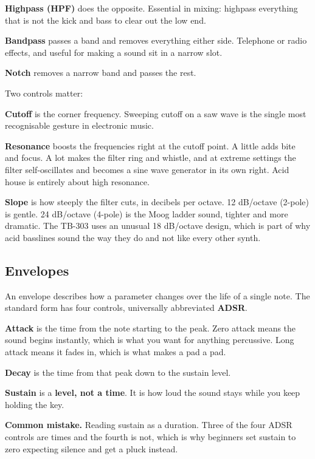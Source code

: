 \textbf{Highpass (HPF)} does the opposite. Essential in mixing: highpass everything that is not
the kick and bass to clear out the low end.

\textbf{Bandpass} passes a band and removes everything either side. Telephone or radio effects,
and useful for making a sound sit in a narrow slot.

\textbf{Notch} removes a narrow band and passes the rest.

Two controls matter:

\textbf{Cutoff} is the corner frequency. Sweeping cutoff on a saw wave is the single most
recognisable gesture in electronic music.

\textbf{Resonance} boosts the frequencies right at the cutoff point. A little adds bite and
focus. A lot makes the filter ring and whistle, and at extreme settings the filter
self-oscillates and becomes a sine wave generator in its own right. Acid house is entirely
about high resonance.

\textbf{Slope} is how steeply the filter cuts, in decibels per octave. 12 dB/octave (2-pole) is
gentle. 24 dB/octave (4-pole) is the Moog ladder sound, tighter and more dramatic. The
TB-303 uses an unusual 18 dB/octave design, which is part of why acid basslines sound the way
they do and not like every other synth.

\subsection{Envelopes}\label{th05_sound_design-envelopes}

An envelope describes how a parameter changes over the life of a single note. The standard
form has four controls, universally abbreviated \textbf{ADSR}.

\textbf{Attack} is the time from the note starting to the peak. Zero attack means the sound
begins instantly, which is what you want for anything percussive. Long attack means it fades
in, which is what makes a pad a pad.

\textbf{Decay} is the time from that peak down to the sustain level.

\textbf{Sustain} is a \textbf{level, not a time}. It is how loud the sound stays while you keep holding
the key.

\begin{pitfallbox}
\textbf{Common mistake.} Reading sustain as a duration. Three of the four ADSR controls are
times and the fourth is not, which is why beginners set sustain to zero expecting silence
and get a pluck instead.
\end{pitfallbox}

